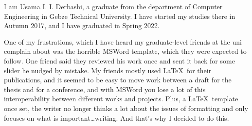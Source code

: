 
I am Usama I. I. Derbashi, a graduate from the department of Computer Engineering in Gebze Technical University. I have started my studies there in Autumn 2017, and I have graduated in Spring 2022.

One of my frustrations, which I have heard my graduate-level friends at the uni complain about was the horrible MSWord template, which they were expected to follow. One friend said they reviewed his work once and sent it back for some slider he nudged by mistake. My friends mostly used \LaTeX~for their publications, and it seemed to be easy to move work between a draft for the thesis and for a conference, and with MSWord you lose a lot of this interoperability between different works and projects. Plus, a \LaTeX~template once set, the writer no longer thinks a lot about the issues of formatting and only focuses on what is important\dots writing. And that's why I decided to do this.



\clearpage